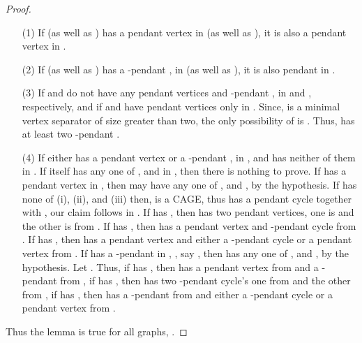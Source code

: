 \documentclass[runningheads]{llncs}
\begin{document}
\begin{proof}
\begin{itemize}
\item[(1)] If  (as well as ) has a pendant vertex in  (as well as ), it is also a pendant vertex in .
\item[(2)] If  (as well as ) has a -pendant ,  in  (as well as ), it is also pendant in .
\item[(3)] If  and  do not have any pendant vertices and -pendant ,  in  and , respectively, and if  and  have pendant vertices only in . Since,  is a minimal vertex separator of size greater than two, the only possibility of  is . Thus,  has at least two -pendant .
\item[(4)] If either  has a pendant vertex or a -pendant ,  in , and  has neither of them in . If  itself has any one of ,  and  in , then there is nothing to prove. If  has a pendant vertex  in , then  may have any one of ,  and , by the hypothesis. If  has none of (i), (ii), and (iii) then,  is a CAGE, thus  has a pendant cycle together with , our claim follows in . If  has , then  has two pendant vertices, one is  and the other is from . If  has , then  has a pendant vertex and -pendant cycle from . If  has , then  has a pendant vertex and either a -pendant cycle or a pendant vertex from . If  has a -pendant  in , , say , then  has any one of ,  and , by the hypothesis. Let . Thus, if  has , then  has a pendant vertex from  and a -pendant  from , if  has , then  has two -pendant cycle's one from  and the other from , if  has , then  has a -pendant  from  and either a -pendant cycle or a pendant vertex from .
\end{itemize}


Thus the lemma is true for all  graphs, . 

\end{proof}
\end{document}
